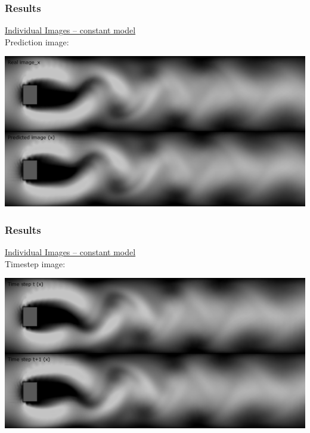 \documentclass[18pt]{beamer}
\begin{document}
\begin{frame}[t]
  \frametitle{Results}
  \vspace{-1cm}
  \begin{center}
    {\large \underline{Individual Images -- constant model}} \\
    Prediction image:
  \end{center}

  \begin{center}
    \includegraphics[scale=0.32]{images/res/prediction}
  \end{center}  
\end{frame}

\begin{frame}[t]
  \frametitle{Results}
  \vspace{-1cm}
  \begin{center}
    {\large \underline{Individual Images -- constant model}} \\
    Timestep image:
  \end{center}

  \begin{center}
    \includegraphics[scale=0.32]{images/res/timestep}
  \end{center}  
\end{frame}
\end{document}
